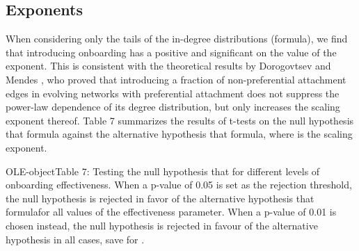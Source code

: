\subsection{Exponents}
When considering only the tails of the in-degree distributions (formula), we find that introducing onboarding has a positive and significant on the value of the exponent. This is consistent with the theoretical results by Dorogovtsev and Mendes \cite{dorogovtsev2002evolution}, who proved that introducing a fraction of non-preferential attachment edges in evolving networks with preferential attachment does not suppress the power-law dependence of its degree distribution, but only increases the scaling exponent thereof. Table 7 summarizes the results of t-tests on the null hypothesis that formula against the alternative hypothesis that formula, where is the scaling exponent. 

OLE-objectTable 7: Testing the null hypothesis that   for different levels of onboarding effectiveness. When a p-value of 0.05 is set as the rejection threshold, the null hypothesis is rejected in favor of the alternative hypothesis that formulafor all values of the effectiveness parameter. When a p-value of 0.01 is chosen instead, the null hypothesis is rejected in favour of the alternative hypothesis in all cases, save for .